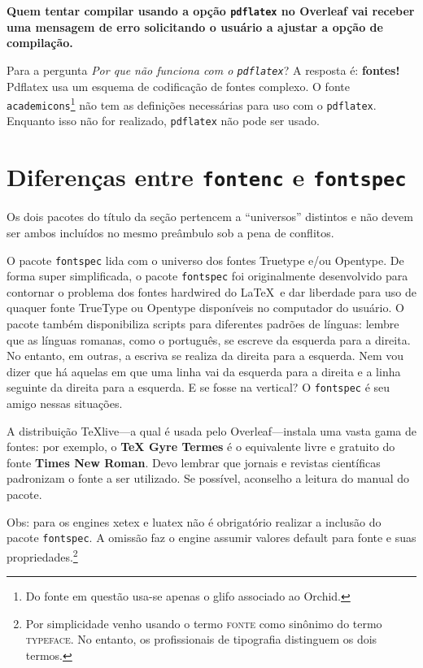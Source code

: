 \documentclass[portuguese]{sbc2025}%
\begin{document}
{\bfseries Quem tentar compilar usando a opção \texttt{pdflatex} no Overleaf vai receber uma mensagem de erro solicitando o usuário a ajustar a opção de compilação.}

Para a pergunta \textit{Por que não funciona com o \texttt{pdflatex}}?  A resposta é: \textbf{fontes!} Pdflatex usa um esquema de codificação de fontes complexo. 
O fonte \texttt{academicons}\footnote{Do fonte em questão usa-se apenas o glifo associado ao Orchid.} não tem as definições necessárias para uso com o \texttt{pdflatex}. Enquanto isso não for realizado, \texttt{pdflatex} não pode ser usado. 

\section{Diferenças entre \texttt{fontenc} e \texttt{fontspec}}

Os dois pacotes do título da seção pertencem a ``universos'' distintos e não devem ser ambos incluídos no mesmo preâmbulo sob a pena de conflitos.

O pacote \texttt{fontspec} lida com o universo dos fontes Truetype e/ou Opentype. De forma super simplificada, o pacote \texttt{fontspec} foi originalmente desenvolvido para contornar o problema dos fontes hardwired do \LaTeX\ e dar liberdade para uso de quaquer fonte TrueType ou Opentype  disponíveis no computador do usuário. O pacote também disponibiliza scripts para diferentes padrões de línguas: lembre que as línguas romanas, como o português, se escreve da esquerda para a direita. No entanto, em outras, a escriva se realiza da direita para a esquerda. Nem vou dizer que há aquelas em que uma linha vai da esquerda para a direita e a linha seguinte da direita para a esquerda. E se fosse na vertical? O \texttt{fontspec} é seu amigo nessas situações.

A distribuição TeXlive---a qual é usada pelo Overleaf---instala uma vasta gama de fontes: por exemplo, o \textbf{TeX Gyre Termes} é o equivalente livre e gratuito do fonte \textbf{Times New Roman}. Devo lembrar que jornais e revistas científicas padronizam o fonte a ser utilizado. Se possível, aconselho a leitura do manual do pacote.  

Obs: para os engines xetex e luatex não é obrigatório realizar a inclusão do pacote \texttt{fontspec}. A omissão faz o engine assumir valores default para fonte e suas propriedades.\footnote{Por simplicidade venho usando o termo \textsc{fonte} como sinônimo do termo \textsc{typeface}. No entanto, os profissionais de tipografia distinguem os dois termos.}
\end{document}
